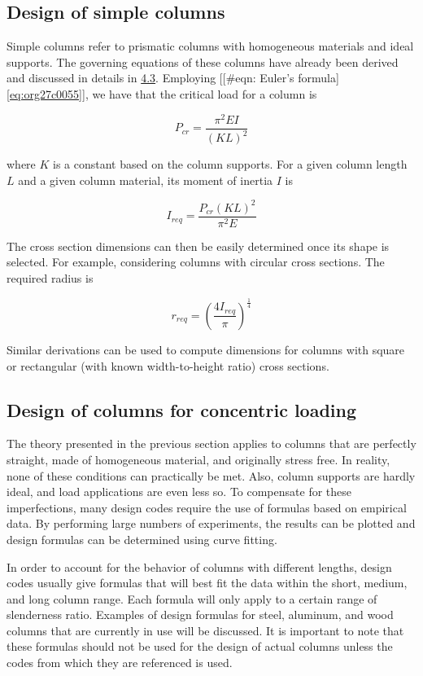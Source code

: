 \documentclass[a4paper,openany,12pt]{book}
\begin{document}
{{\subsection{Design of simple columns}
\label{sec:orgc8d3c62}
Simple columns refer to prismatic columns with homogeneous materials and
ideal supports. The governing equations of these columns have already
been derived and discussed in details in \hyperref[sec:orga5a5e81]{4.3}.
Employing [[\#eqn: Euler's formula]\ref{eq:org27c0055}], we have
that the critical load for a column is

$$P_{cr} = \frac{\pi ^2EI}{(KL)^2}$$

where \(K\) is a constant based on the column supports. For a given column
length \(L\) and a given column material, its moment of inertia \(I\) is

$$I_{req} = \frac{P_{cr}(KL)^2}{\pi ^2E}$$

The cross section dimensions can then be easily determined once its
shape is selected. For example, considering columns with circular cross
sections. The required radius is

$$r_{req} = \left( \frac{4I_{req}}{\pi } \right)^{\frac{1}{4}}$$

Similar derivations can be used to compute dimensions for columns with
square or rectangular (with known width-to-height ratio) cross sections.

\subsection{Design of columns for concentric loading}
\label{sec:orgbe50252}
The theory presented in the previous section applies to columns that are
perfectly straight, made of homogeneous material, and originally stress
free. In reality, none of these conditions can practically be met. Also,
column supports are hardly ideal, and load applications are even less
so. To compensate for these imperfections, many design codes require the
use of formulas based on empirical data. By performing large numbers of
experiments, the results can be plotted and design formulas can be
determined using curve fitting.

In order to account for the behavior of columns with different lengths,
design codes usually give formulas that will best fit the data within
the short, medium, and long column range. Each formula will only apply
to a certain range of slenderness ratio. Examples of design formulas for
steel, aluminum, and wood columns that are currently in use will be
discussed. It is important to note that these formulas should not be
used for the design of actual columns unless the codes from which they
are referenced is used.

}}
\end{document}
